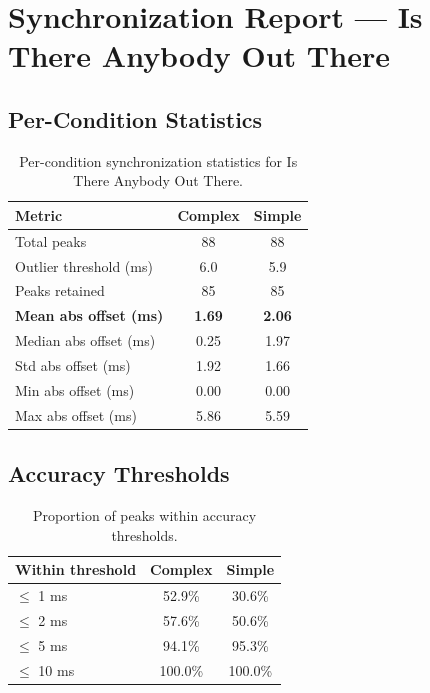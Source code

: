 
\section*{Synchronization Report --- Is There Anybody Out There}

\subsection*{Per-Condition Statistics}

\begin{table}[h!]
\centering
\begin{tabular}{|l|c|c|}
\hline
Metric & Complex & Simple \\
\hline
Total peaks & 88 & 88 \\
Outlier threshold (ms) & 6.0 & 5.9 \\
Peaks retained & 85 & 85 \\
\textbf{Mean abs offset (ms)} & \textbf{1.69} & \textbf{2.06} \\
Median abs offset (ms) & 0.25 & 1.97 \\
Std abs offset (ms) & 1.92 & 1.66 \\
Min abs offset (ms) & 0.00 & 0.00 \\
Max abs offset (ms) & 5.86 & 5.59 \\
\hline
\end{tabular}
\caption{Per-condition synchronization statistics for Is There Anybody Out There.}
\label{tab:sync_stats}
\end{table}

\subsection*{Accuracy Thresholds}

\begin{table}[h!]
\centering
\begin{tabular}{|l|c|c|}
\hline
Within threshold & Complex & Simple \\
\hline
$\leq$ 1 ms & 52.9\% & 30.6\% \\
$\leq$ 2 ms & 57.6\% & 50.6\% \\
$\leq$ 5 ms & 94.1\% & 95.3\% \\
$\leq$ 10 ms & 100.0\% & 100.0\% \\
\hline
\end{tabular}
\caption{Proportion of peaks within accuracy thresholds.}
\label{tab:sync_accuracy}
\end{table}

